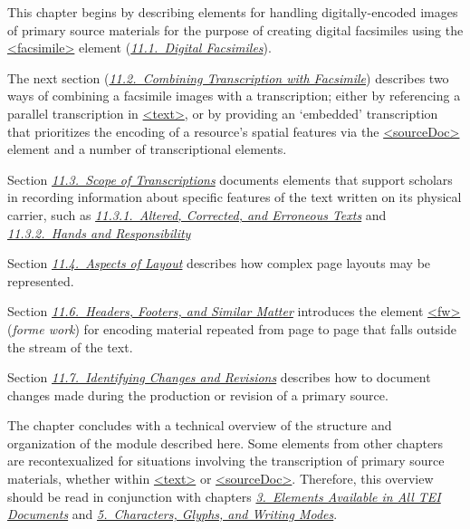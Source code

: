 This chapter begins by describing elements for handling digitally-encoded images of primary source materials for the purpose of creating digital facsimiles using the \hyperref[TEI.facsimile]{<facsimile>} element (\textit{\hyperref[PHFAX]{11.1.\ Digital Facsimiles}}).\par
The next section (\textit{\hyperref[PH-transcr]{11.2.\ Combining Transcription with Facsimile}}) describes two ways of combining a facsimile images with a transcription; either by referencing a parallel transcription in \hyperref[TEI.text]{<text>}, or by providing an ‘embedded’ transcription that prioritizes the encoding of a resource’s spatial features via the \hyperref[TEI.sourceDoc]{<sourceDoc>} element and a number of transcriptional elements.\par
Section \textit{\hyperref[PHST]{11.3.\ Scope of Transcriptions}} documents elements that support scholars in recording information about specific features of the text written on its physical carrier, such as \textit{\hyperref[PHCH]{11.3.1.\ Altered, Corrected, and Erroneous Texts}} and \textit{\hyperref[PHPH]{11.3.2.\ Hands and Responsibility}}\par
Section \textit{\hyperref[PHLAY]{11.4.\ Aspects of Layout}} describes how complex page layouts may be represented.\par
Section \textit{\hyperref[PHSK]{11.6.\ Headers, Footers, and Similar Matter}} introduces the element \hyperref[TEI.fw]{<fw>} (\textit{forme work}) for encoding material repeated from page to page that falls outside the stream of the text.\par
Section \textit{\hyperref[PH-changes]{11.7.\ Identifying Changes and Revisions}} describes how to document changes made during the production or revision of a primary source.\par
The chapter concludes with a technical overview of the structure and organization of the module described here. Some elements from other chapters are recontexualized for situations involving the transcription of primary source materials, whether within \hyperref[TEI.text]{<text>} or \hyperref[TEI.sourceDoc]{<sourceDoc>}. Therefore, this overview should be read in conjunction with chapters \textit{\hyperref[CO]{3.\ Elements Available in All TEI Documents}} and \textit{\hyperref[WD]{5.\ Characters, Glyphs, and Writing Modes}}.
